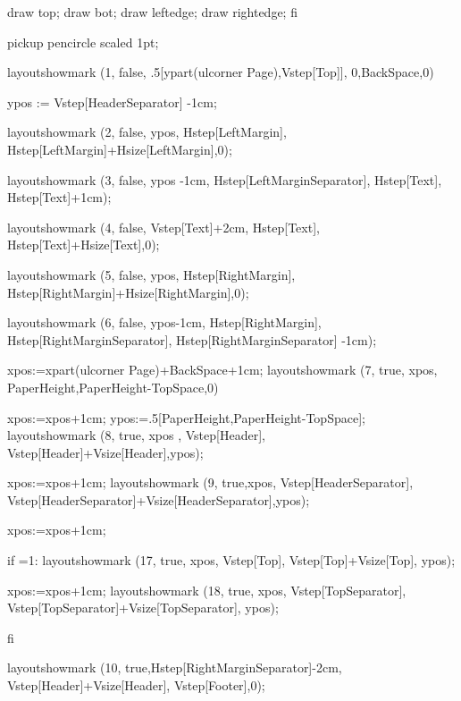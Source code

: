    draw top;
   draw bot;
   draw leftedge;
   draw rightedge;
fi

pickup pencircle scaled 1pt;


layoutshowmark (1, false, .5[ypart(ulcorner Page),Vstep[Top]], 0,BackSpace,0)


ypos := Vstep[HeaderSeparator] -1cm;

layoutshowmark (2, false, ypos,
                Hstep[LeftMargin],
                Hstep[LeftMargin]+Hsize[LeftMargin],0);
 
layoutshowmark (3, false, ypos -1cm,
                Hstep[LeftMarginSeparator],
                Hstep[Text],
                Hstep[Text]+1cm);

layoutshowmark (4, false, Vstep[Text]+2cm,
                Hstep[Text], Hstep[Text]+Hsize[Text],0);

layoutshowmark (5, false, ypos,
                Hstep[RightMargin],
                Hstep[RightMargin]+Hsize[RightMargin],0);
 
layoutshowmark (6, false, ypos-1cm,
                Hstep[RightMargin],
                Hstep[RightMarginSeparator],
                Hstep[RightMarginSeparator] -1cm);



xpos:=xpart(ulcorner Page)+BackSpace+1cm;
layoutshowmark (7, true, xpos, PaperHeight,PaperHeight-TopSpace,0)

xpos:=xpos+1cm;
ypos:=.5[PaperHeight,PaperHeight-TopSpace];
layoutshowmark (8, true, xpos ,
                Vstep[Header],
                Vstep[Header]+Vsize[Header],ypos);

xpos:=xpos+1cm;
layoutshowmark (9, true,xpos,
                Vstep[HeaderSeparator],
                Vstep[HeaderSeparator]+Vsize[HeaderSeparator],ypos);

xpos:=xpos+1cm;

if =1:
   layoutshowmark (17, true, xpos,
                   Vstep[Top],
                   Vstep[Top]+Vsize[Top], ypos);

   xpos:=xpos+1cm;
   layoutshowmark (18, true, xpos,
                   Vstep[TopSeparator],
                   Vstep[TopSeparator]+Vsize[TopSeparator], ypos);
              
fi
     
layoutshowmark (10, true,Hstep[RightMarginSeparator]-2cm,
                Vstep[Header]+Vsize[Header],
                Vstep[Footer],0);


